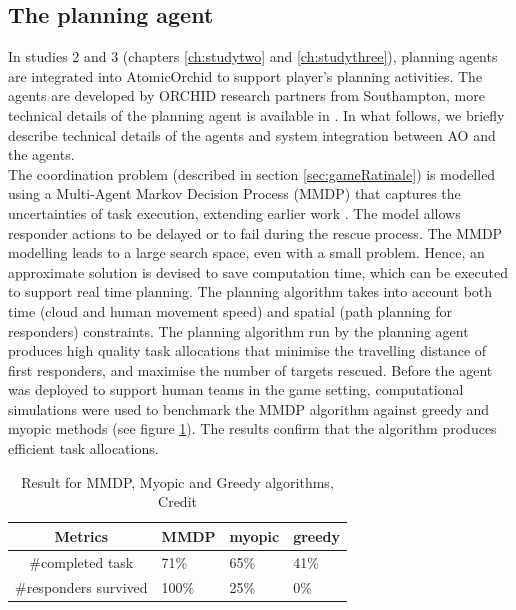 \subsection{The planning agent}\label{sec:appagent}
In studies 2 and 3 (chapters \ref{ch:studytwo} and \ref{ch:studythree}), planning agents are integrated into AtomicOrchid to support player's planning activities. The agents are developed by ORCHID research partners from Southampton, more technical details of the planning agent is available in \cite{Ramchurn2015a}. In what follows, we briefly describe technical details of the agents and system integration between \ac{AO} and the agents.  \\

The coordination problem (described in section \ref{sec:gameRatinale}) is modelled using a Multi-Agent Markov Decision Process (MMDP) that captures the uncertainties of task execution, extending earlier work \citep{Wu2015}. The model allows responder actions to be delayed or to fail during the rescue process. The MMDP modelling leads to a large search space, even with a small problem. Hence,  an approximate solution is devised to save computation time, which can be executed to support real time planning. The planning algorithm takes into account both time (cloud and human movement speed) and spatial (path planning for responders) constraints. The planning algorithm run by the planning agent produces high quality task allocations that minimise the travelling distance of first responders, and maximise the number of targets rescued. Before the agent was deployed to support human teams in the game setting, computational simulations were used to benchmark the MMDP algorithm against greedy and myopic methods (see figure \ref{tab:agentBenchmarking}). The results confirm that the algorithm produces efficient task allocations.\\


\begin{table}[h]
\centering
\begin{tabular}{c|lll}
Metrics               & MMDP  & myopic & greedy \\ \hline
\#completed task      & 71\%  & 65\%   & 41\%   \\
\#responders survived & 100\% & 25\%   & 0\%   
\end{tabular}
\caption{Result for MMDP, Myopic and Greedy algorithms, Credit \cite{Ramchurn2015a}}
\label{tab:agentBenchmarking}
\end{table}

